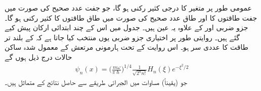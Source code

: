  عمومی طور پر  متغیر  کا  درجی کثیر رکنی ہو گا، جو جفت عدد صحیح  کی صورت میں جفت طاقتوں کا اور طاق عدد صحیح  کی صورت میں طاق طاقتوں کا کثیر رکنی ہو گا۔ جزو ضربی  اور 
کے علاوہ یہ عین   ہیں۔ جدول  میں اس کے چند ابتدائی ارکان پیش کیے گئے ہیں۔ روایتی طور پر اختیاری جزو ضربی یوں منتخب کیا جاتا ہے کہ  کے بلند تر طاقت کا عددی سر  ہو۔ اس روایت کے تحت ہارمونی مرتعش کے معمول شدہ ساکن حالات درج ذیل ہوں گے
\begin{align}\label{مساوات_غیر_تابع_شروڈنگر_ہارمونی_معمول_شدہ_این_ویں}
\psi_{n}(x)=\big (\frac{m\omega}{\pi\hslash}\big )^{1/4}\frac{1}{\sqrt{2^{n}n!}}H_{n}(\xi)e^{-\xi^{2}/2}
\end{align}
جو (یقیناً) مساوات  میں الجبرائی طریقے سے حاصل نتائج کے متماثل ہیں۔

